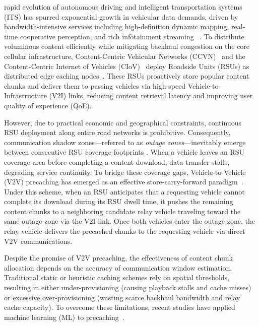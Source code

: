 \documentclass[journal]{IEEEtran}
\begin{document}
 rapid evolution of autonomous driving and intelligent transportation systems (ITS) has spurred exponential growth in vehicular data demands, driven by bandwidth-intensive services including high-definition dynamic mapping, real-time cooperative perception, and rich infotainment streaming ~\cite{ITS1, ITS2}. To distribute voluminous content efficiently while mitigating backhaul congestion on the core cellular infrastructure, Content-Centric Vehicular Networks (CCVN)~\cite{Bouk2015,Su2017,Wang2019,Zhang2019} and the Content-Centric Internet of Vehicles (CIoV)~\cite{Nam2025,Wu2020,Gupta2023,Liang2025} deploy Roadside Units (RSUs) as distributed edge caching nodes~\cite{Kim2017,Yuan2018,Zeng2023}. These RSUs proactively store popular content chunks and deliver them to passing vehicles via high-speed Vehicle-to-Infrastructure (V2I) links, reducing content retrieval latency and improving user quality of experience (QoE). 

However, due to practical economic and geographical constraints, continuous RSU deployment along entire road networks is prohibitive. Consequently, communication shadow zones---referred to as \textit{outage zones}---inevitably emerge between consecutive RSU coverage footprints \cite{Wang2017, Nam2023}. When a vehicle leaves an RSU coverage area before completing a content download, data transfer stalls, degrading service continuity. To bridge these coverage gaps, Vehicle-to-Vehicle (V2V) precaching has emerged as an effective store-carry-forward paradigm~\cite{Wu2013,Wang2017,Ahmed2018,Nam2023}. Under this scheme, when an RSU anticipates that a requesting vehicle cannot complete its download during its RSU dwell time, it pushes the remaining content chunks to a neighboring candidate relay vehicle traveling toward the same outage zone via the V2I link. Once both vehicles enter the outage zone, the relay vehicle delivers the precached chunks to the requesting vehicle via direct V2V communications.

Despite the promise of V2V precaching, the effectiveness of content chunk allocation depends on the accuracy of communication window estimation. Traditional static or heuristic caching schemes rely on spatial thresholds, resulting in either under-provisioning (causing playback stalls and cache misses) or excessive over-provisioning (wasting scarce backhaul bandwidth and relay cache capacity). To overcome these limitations, recent studies have applied machine learning (ML) to precaching~\cite{Wang2025,Aung2023,QWu2023,Sun2023,TWang2024,Feng2023,ZLi2024}. 
\end{document}

